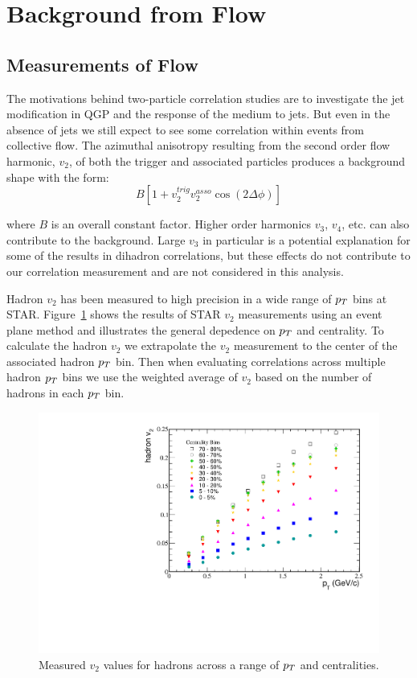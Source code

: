 \section{Background from Flow}

\subsection{Measurements of Flow}

The motivations behind two-particle correlation studies are to investigate the jet modification in QGP and the response of the medium to jets. But even in the absence of jets we still expect to see some correlation within events from collective flow. The azimuthal anisotropy resulting from the second order flow harmonic, $v_2$, of both the trigger and associated particles produces a background shape with the form:
\begin{equation}\label{eq:v2background}
 B[1 + v^{trig}_{2}v^{asso}_{2} \cos(2\Delta\phi)] 
\end{equation}

where $B$ is an overall constant factor. Higher order harmonics $v_3$, $v_4$, etc. can also contribute to the background. Large $v_3$ in particular is a potential explanation for some of the results in dihadron correlations, but these effects do not contribute to our correlation measurement and are not considered in this analysis. 

Hadron $v_2$ has been measured to high precision in a wide range of $p_{T}$ bins at STAR. Figure~\ref{fig:STARHadv2} shows the results of STAR $v_2$ measurements using an event plane method and illustrates the general depedence on $p_{T}$ and centrality. To calculate the hadron $v_2$ we extrapolate the $v_2$ measurement to the center of the associated hadron $p_{T}$ bin. Then when evaluating correlations across multiple hadron $p_{T}$ bins we use the weighted average of $v_2$ based on the number of hadrons in each $p_{T}$ bin.

\begin{figure}[htbp]
\begin{center}
\includegraphics[scale=.8]{Plots/Correlations/STAR_hadron_v2.pdf}
\end{center}
\caption[STAR measured hadron $v_2$]{Measured $v_2$ values for hadrons across a range of $p_{T}$ and centralities.}
\label{fig:STARHadv2}
\end{figure}

